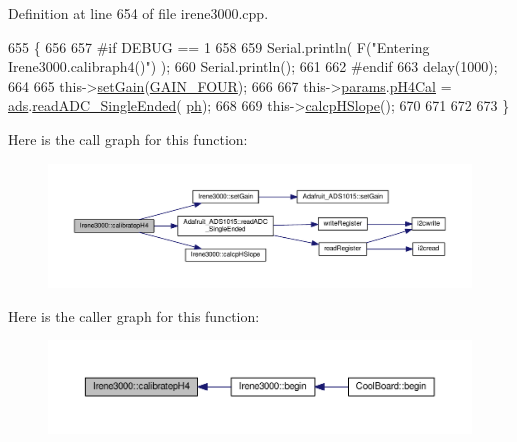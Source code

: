 Definition at line 654 of file irene3000.\+cpp.


\begin{DoxyCode}
655 \{
656 
657 \textcolor{preprocessor}{#if DEBUG == 1 }
658 
659     Serial.println( F(\textcolor{stringliteral}{"Entering Irene3000.calibraph4()"}) );
660     Serial.println();
661 
662 \textcolor{preprocessor}{#endif }
663     delay(1000);
664 
665     this->\hyperlink{class_irene3000_aff7c5da186b388e7272e63ff88a20c34}{setGain}(\hyperlink{_cool_adafruit___a_d_s1015_8h_a3d6c0e15829a207b9155890811fa4781a33fa5521f4e806b7438052fcdbbf8660}{GAIN\_FOUR});
666 
667     this->\hyperlink{class_irene3000_a136585a5ee7f9ac6ab52175fa153f8e3}{params}.\hyperlink{struct_irene3000_1_1parameters___t_a1144de6fb54eb3e1dd2a3d8c2afc97dc}{pH4Cal} =  \hyperlink{class_irene3000_a1215e77ba761c9908d80d691f149e135}{ads}.\hyperlink{class_adafruit___a_d_s1015_a40f38b9e1f3ec397c0670dd632510235}{readADC\_SingleEnded}(
      \hyperlink{_irene3000_8h_af771ceafe0e6524dd8497d4305dfe778}{ph});
668 
669     this->\hyperlink{class_irene3000_a81f6a79e546679692053f7ac1af49613}{calcpHSlope}();
670 
671 
672 
673 \}
\end{DoxyCode}
Here is the call graph for this function\+:\nopagebreak
\begin{figure}[H]
\begin{center}
\leavevmode
\includegraphics[width=350pt]{d6/d03/class_irene3000_aa140dd026922a04981edfd04d46cabbe_cgraph}
\end{center}
\end{figure}
Here is the caller graph for this function\+:\nopagebreak
\begin{figure}[H]
\begin{center}
\leavevmode
\includegraphics[width=350pt]{d6/d03/class_irene3000_aa140dd026922a04981edfd04d46cabbe_icgraph}
\end{center}
\end{figure}
\mbox{\label{class_irene3000_a1d3299202e4cb7afcff9c9e3e95d94c1}} 
